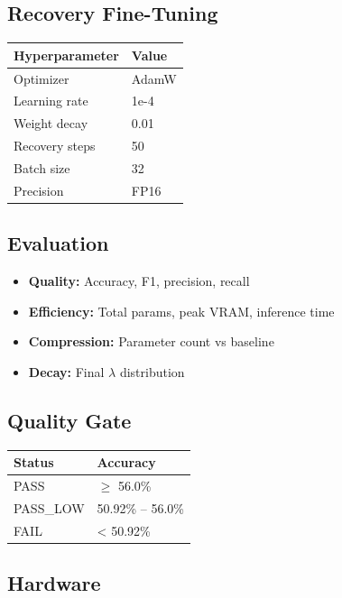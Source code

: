 \subsection{Recovery Fine-Tuning}

\begin{table}[H]
\centering
\small
\begin{tabular}{ll}
\toprule
\textbf{Hyperparameter} & \textbf{Value} \\
\midrule
Optimizer & AdamW \\
Learning rate & 1e-4 \\
Weight decay & 0.01 \\
Recovery steps & 50 \\
Batch size & 32 \\
Precision & FP16 \\
\bottomrule
\end{tabular}
\end{table}

\subsection{Evaluation}

\begin{itemize}
\item \textbf{Quality:} Accuracy, F1, precision, recall
\item \textbf{Efficiency:} Total params, peak VRAM, inference time
\item \textbf{Compression:} Parameter count vs baseline
\item \textbf{Decay:} Final $\lambda$ distribution

\end{itemize}
\subsection{Quality Gate}

\begin{table}[H]
\centering
\small
\begin{tabular}{ll}
\toprule
\textbf{Status} & \textbf{Accuracy} \\
\midrule
PASS & $\ge$ 56.0\% \\
PASS\_LOW & 50.92\% -- 56.0\% \\
FAIL & \textless{} 50.92\% \\
\bottomrule
\end{tabular}
\end{table}

\subsection{Hardware}

